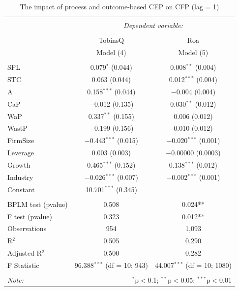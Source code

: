 \documentclass[12pt,]{article}
\begin{document}
\begin{table}[!] \centering 
  \caption{The impact of process and outcome-based CEP on CFP (lag = 1)} 
  \label{Lag1} 
\begin{tabular}{@{\extracolsep{5pt}}lcc} 
\\[-1.8ex]\hline 
\hline \\[-1.8ex] 
 & \multicolumn{2}{c}{\textit{Dependent variable:}} \\ 
\cline{2-3} 
\\[-1.8ex] & TobinsQ & Roa \\ 
 & Model (4) & Model (5) \\ 
\hline \\[-1.8ex] 
 SPL & 0.079$^{*}$ (0.044) & 0.008$^{**}$ (0.004) \\ 
  STC & 0.063 (0.044) & 0.012$^{***}$ (0.004) \\ 
  A & 0.158$^{***}$ (0.044) & $-$0.004 (0.004) \\ 
  CaP & $-$0.012 (0.135) & 0.030$^{**}$ (0.012) \\ 
  WaP & 0.337$^{**}$ (0.155) & 0.006 (0.012) \\ 
  WastP & $-$0.199 (0.156) & 0.010 (0.012) \\ 
  FirmSize & $-$0.443$^{***}$ (0.015) & $-$0.020$^{***}$ (0.001) \\ 
  Leverage & 0.003 (0.003) & $-$0.00000 (0.0003) \\ 
  Growth & 0.465$^{***}$ (0.152) & 0.138$^{***}$ (0.012) \\ 
  Industry & $-$0.026$^{***}$ (0.007) & $-$0.002$^{***}$ (0.001) \\ 
  Constant & 10.701$^{***}$ (0.345) &  \\ 
 \hline \\[-1.8ex] 
BPLM test (pvalue) & 0.508 & 0.024** \\ 
F test (pvalue) & 0.323 & 0.012** \\ 
Observations & 954 & 1,093 \\ 
R$^{2}$ & 0.505 & 0.290 \\ 
Adjusted R$^{2}$ & 0.500 & 0.282 \\ 
F Statistic & 96.388$^{***}$ (df = 10; 943) & 44.007$^{***}$ (df = 10; 1080) \\ 
\hline 
\hline \\[-1.8ex] 
\textit{Note:}  & \multicolumn{2}{r}{$^{*}$p$<$0.1; $^{**}$p$<$0.05; $^{***}$p$<$0.01} \\ 
\end{tabular} 
\end{table}
\end{document}
